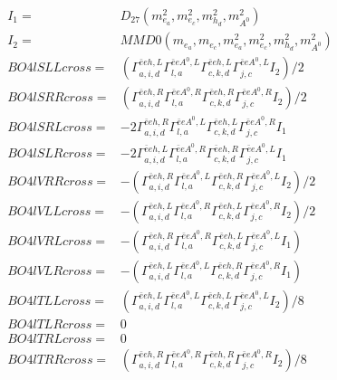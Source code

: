 \documentclass[A4,landscape]{article}
\begin{document}
\begin{align} 
I_1 = & D_{27}(m^2_{e_{{a}}}, m^2_{e_{{c}}}, m^2_{h_{{d}}}, m^2_{A^0}) \\ 
I_2 = & MMD0(m_{e_{{a}}}, m_{e_{{c}}}, m^2_{e_{{a}}}, m^2_{e_{{c}}}, m^2_{h_{{d}}}, m^2_{A^0}) \\ 
  BO4lSLLcross= & ( \Gamma^{\bar{e}e h ,L}_{a, i, d} \Gamma^{\bar{e}e A^0 ,L}_{l, a} \Gamma^{\bar{e}e h ,L}_{c, k, d} \Gamma^{\bar{e}e A^0 ,L}_{j, c} I_2)/2 \\ 
  BO4lSRRcross= & ( \Gamma^{\bar{e}e h ,R}_{a, i, d} \Gamma^{\bar{e}e A^0 ,R}_{l, a} \Gamma^{\bar{e}e h ,R}_{c, k, d} \Gamma^{\bar{e}e A^0 ,R}_{j, c} I_2)/2 \\ 
  BO4lSRLcross= & -2  \Gamma^{\bar{e}e h ,R}_{a, i, d} \Gamma^{\bar{e}e A^0 ,L}_{l, a} \Gamma^{\bar{e}e h ,L}_{c, k, d} \Gamma^{\bar{e}e A^0 ,R}_{j, c} I_1 \\ 
  BO4lSLRcross= & -2  \Gamma^{\bar{e}e h ,L}_{a, i, d} \Gamma^{\bar{e}e A^0 ,R}_{l, a} \Gamma^{\bar{e}e h ,R}_{c, k, d} \Gamma^{\bar{e}e A^0 ,L}_{j, c} I_1 \\ 
  BO4lVRRcross= & -( \Gamma^{\bar{e}e h ,R}_{a, i, d} \Gamma^{\bar{e}e A^0 ,L}_{l, a} \Gamma^{\bar{e}e h ,R}_{c, k, d} \Gamma^{\bar{e}e A^0 ,L}_{j, c} I_2)/2 \\ 
  BO4lVLLcross= & -( \Gamma^{\bar{e}e h ,L}_{a, i, d} \Gamma^{\bar{e}e A^0 ,R}_{l, a} \Gamma^{\bar{e}e h ,L}_{c, k, d} \Gamma^{\bar{e}e A^0 ,R}_{j, c} I_2)/2 \\ 
  BO4lVRLcross= & -( \Gamma^{\bar{e}e h ,R}_{a, i, d} \Gamma^{\bar{e}e A^0 ,R}_{l, a} \Gamma^{\bar{e}e h ,L}_{c, k, d} \Gamma^{\bar{e}e A^0 ,L}_{j, c} I_1) \\ 
  BO4lVLRcross= & -( \Gamma^{\bar{e}e h ,L}_{a, i, d} \Gamma^{\bar{e}e A^0 ,L}_{l, a} \Gamma^{\bar{e}e h ,R}_{c, k, d} \Gamma^{\bar{e}e A^0 ,R}_{j, c} I_1) \\ 
  BO4lTLLcross= & ( \Gamma^{\bar{e}e h ,L}_{a, i, d} \Gamma^{\bar{e}e A^0 ,L}_{l, a} \Gamma^{\bar{e}e h ,L}_{c, k, d} \Gamma^{\bar{e}e A^0 ,L}_{j, c} I_2)/8 \\ 
  BO4lTLRcross= & 0 \\ 
  BO4lTRLcross= & 0 \\ 
  BO4lTRRcross= & ( \Gamma^{\bar{e}e h ,R}_{a, i, d} \Gamma^{\bar{e}e A^0 ,R}_{l, a} \Gamma^{\bar{e}e h ,R}_{c, k, d} \Gamma^{\bar{e}e A^0 ,R}_{j, c} I_2)/8 \\ 
\end{align} 
\end{document}
